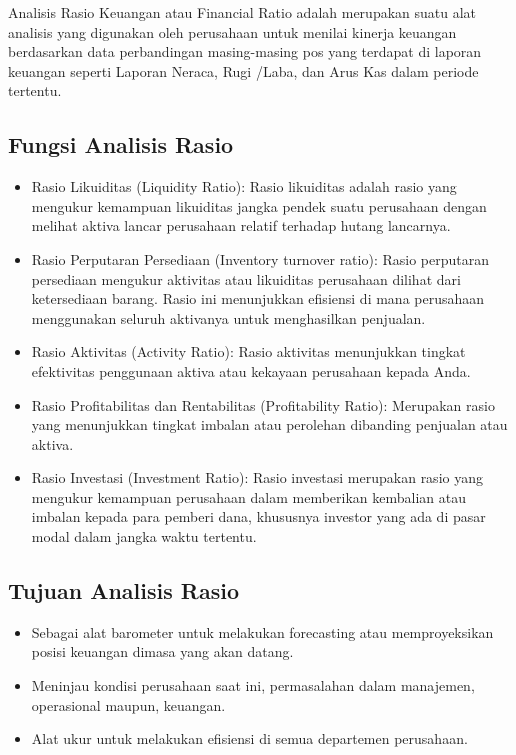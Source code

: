 \documentclass[
]{book}
\providecommand{\tightlist}{%
  \setlength{\itemsep}{0pt}\setlength{\parskip}{0pt}}
\begin{document}
Analisis Rasio Keuangan atau Financial Ratio adalah merupakan suatu alat analisis yang digunakan oleh perusahaan untuk menilai kinerja keuangan berdasarkan data perbandingan masing-masing pos yang terdapat di laporan keuangan seperti Laporan Neraca, Rugi /Laba, dan Arus Kas dalam periode tertentu.

\hypertarget{fungsi-analisis-rasio}{%
\subsection{Fungsi Analisis Rasio}\label{fungsi-analisis-rasio}}

\begin{itemize}
\tightlist
\item
  Rasio Likuiditas (Liquidity Ratio): Rasio likuiditas adalah rasio yang mengukur kemampuan likuiditas jangka pendek suatu perusahaan dengan melihat aktiva lancar perusahaan relatif terhadap hutang lancarnya.
\item
  Rasio Perputaran Persediaan (Inventory turnover ratio): Rasio perputaran persediaan mengukur aktivitas atau likuiditas perusahaan dilihat dari ketersediaan barang. Rasio ini menunjukkan efisiensi di mana perusahaan menggunakan seluruh aktivanya untuk menghasilkan penjualan.
\item
  Rasio Aktivitas (Activity Ratio): Rasio aktivitas menunjukkan tingkat efektivitas penggunaan aktiva atau kekayaan perusahaan kepada Anda.
\item
  Rasio Profitabilitas dan Rentabilitas (Profitability Ratio): Merupakan rasio yang menunjukkan tingkat imbalan atau perolehan dibanding penjualan atau aktiva.
\item
  Rasio Investasi (Investment Ratio): Rasio investasi merupakan rasio yang mengukur kemampuan perusahaan dalam memberikan kembalian atau imbalan kepada para pemberi dana, khususnya investor yang ada di pasar modal dalam jangka waktu tertentu.
\end{itemize}

\hypertarget{tujuan-analisis-rasio}{%
\subsection{Tujuan Analisis Rasio}\label{tujuan-analisis-rasio}}

\begin{itemize}
\tightlist
\item
  Sebagai alat barometer untuk melakukan forecasting atau memproyeksikan posisi keuangan dimasa yang akan datang.
\item
  Meninjau kondisi perusahaan saat ini, permasalahan dalam manajemen, operasional maupun, keuangan.
\item
  Alat ukur untuk melakukan efisiensi di semua departemen perusahaan.
\end{itemize}
\end{document}
